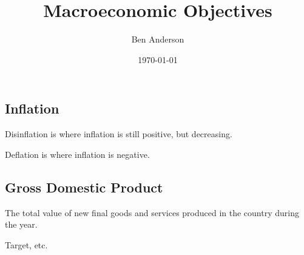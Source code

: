 \documentclass[a4paper,11pt]{article}
\begin{document}
\title{Macroeconomic Objectives}
\author{Ben Anderson}
\date{\today}
\maketitle
\pagebreak

\tableofcontents
\pagebreak


\subsection{Inflation}

Disinflation is where inflation is still positive, but decreasing.

Deflation is where inflation is negative.


\subsection{Gross Domestic Product}

The total value of new final goods and services produced in the country during
the year.

Target, etc.
\end{document}
